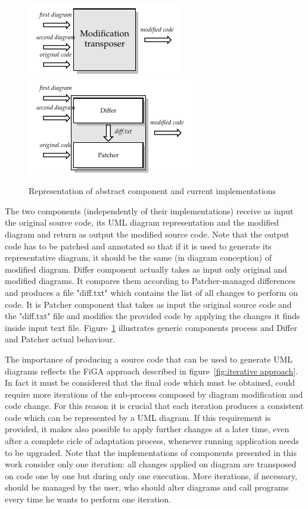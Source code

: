 \begin{figure}[htbp]
   \centering
   \includegraphics{figs/abstractComp.pdf}
   \hspace{1.5cm}
   \includegraphics{figs/concreteComp.pdf}
   \vspace*{5pt}
   \caption{Representation of abstract component and current implementations}\label{generic components i/o}
\end{figure}

The two components (independently of their implementations) receive as input the original source code, its UML diagram representation and the modified diagram and return as output the modified source code. Note that the output code has to be patched and annotated so that if it is used to generate its representative diagram, it should be the same (in diagram conception) of modified diagram.
Differ component actually takes as input only original and modified diagrams. It compares them according to Patcher-managed differences and produces a file "diff.txt" which contains the list of all changes to perform on code. It is Patcher component that takes as input the original source code and the "diff.txt" file and modifies the provided code by applying the changes it finds inside input text file.
Figure~\ref{generic components i/o} illustrates generic components process and Differ and Patcher actual behaviour.

The importance of producing a source code that can be used to generate UML diagrams reflects the FiGA approach described in figure~\ref{fig:iterative approach}. In fact it must be considered that the final code which must be obtained, could require more iterations of the sub-process composed by diagram modification and code change. For this reason it is crucial that each iteration produces a consistent code which can be represented by a UML diagram.
If this requirement is provided, it makes also possible to apply further changes at a later time, even after a complete cicle of adaptation process, whenever running application needs to be upgraded.
Note that the implementations of components presented in this work consider only one iteration: all changes applied on diagram are transposed on code one by one but during only one execution. More iterations, if necessary, should be managed by the user, who should alter diagrams and call programs every time he wants to perform one iteration.

